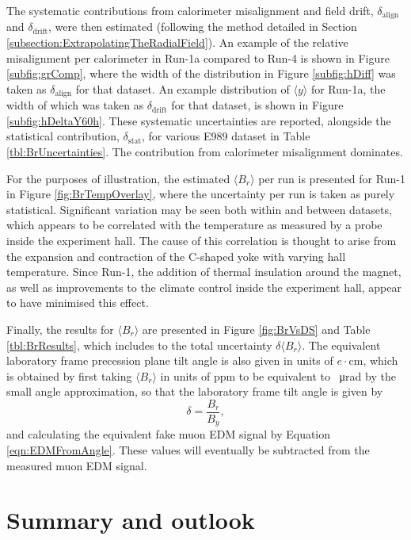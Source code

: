 The systematic contributions from calorimeter misalignment and field drift, $\delta_{\text{align}}$ and $\delta_{\text{drift}}$, were then estimated (following the method detailed in Section \ref{subsection:ExtrapolatingTheRadialField}). An example of the relative misalignment per calorimeter in Run-1a compared to Run-4 is shown in Figure \ref{subfig:grComp}, where the width of the distribution in Figure \ref{subfig:hDiff} was taken as $\delta_{\text{align}}$ for that dataset. An example distribution of $\langle y \rangle$ for Run-1a, the width of which was taken as $\delta_{\text{drift}}$ for that dataset, is shown in Figure \ref{subfig:hDeltaY60h}. These systematic uncertainties are reported, alongside the statistical contribution, $\delta_{\text{stat}}$, for various E989 dataset in Table \ref{tbl:BrUncertainties}. The contribution from calorimeter misalignment dominates. 

For the purposes of illustration, the estimated $\langle B_{r} \rangle$ per run is presented for Run-1 in Figure \ref{fig:BrTempOverlay}, where the uncertainty per run is taken as purely statistical. Significant variation may be seen both within and between datasets, which appears to be correlated with the temperature as measured by a probe inside the experiment hall. The cause of this correlation is thought to arise from the expansion and contraction of the C-shaped yoke with varying hall temperature. Since Run-1, the addition of thermal insulation around the magnet, as well as improvements to the climate control inside the experiment hall, appear to have minimised this effect. 

Finally, the results for $\langle B_{r} \rangle$ are presented in Figure \ref{fig:BrVsDS} and Table \ref{tbl:BrResults}, which includes to the total uncertainty $\delta \langle B_{r} \rangle$. The equivalent laboratory frame precession plane tilt angle is also given in units of $e\cdot$cm, which is obtained by first taking $\langle B_{r} \rangle$ in units of ppm to be equivalent to \SI{}{\micro\radian} by the small angle approximation, so that the laboratory frame tilt angle is given by
%
\begin{equation}
  \delta = \frac{B_{r}}{B_{y}},
\end{equation}
% 
and calculating the equivalent fake muon EDM signal by Equation \ref{eqn:EDMFromAngle}. These values will eventually be subtracted from the measured muon EDM signal. 

\section{Summary and outlook}

